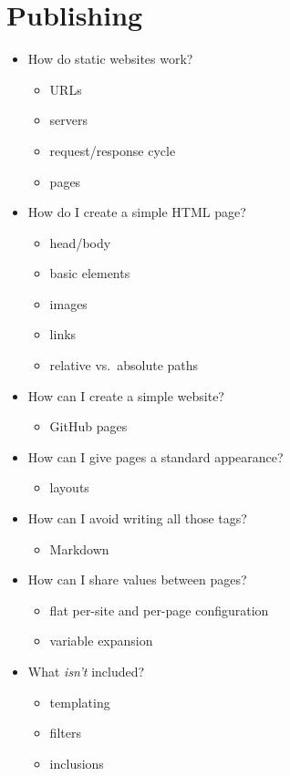 \documentclass[]{Nemilov}
\providecommand{\tightlist}{%
  \setlength{\itemsep}{0pt}\setlength{\parskip}{0pt}}
\begin{document}
\hypertarget{publishing}{%
\section{Publishing}\label{publishing}}

\begin{itemize}
\tightlist
\item
  How do static websites work?

  \begin{itemize}
  \tightlist
  \item
    URLs
  \item
    servers
  \item
    request/response cycle
  \item
    pages
  \end{itemize}
\item
  How do I create a simple HTML page?

  \begin{itemize}
  \tightlist
  \item
    head/body
  \item
    basic elements
  \item
    images
  \item
    links
  \item
    relative vs.~absolute paths
  \end{itemize}
\item
  How can I create a simple website?

  \begin{itemize}
  \tightlist
  \item
    GitHub pages
  \end{itemize}
\item
  How can I give pages a standard appearance?

  \begin{itemize}
  \tightlist
  \item
    layouts
  \end{itemize}
\item
  How can I avoid writing all those tags?

  \begin{itemize}
  \tightlist
  \item
    Markdown
  \end{itemize}
\item
  How can I share values between pages?

  \begin{itemize}
  \tightlist
  \item
    flat per-site and per-page configuration
  \item
    variable expansion
  \end{itemize}
\item
  What \emph{isn't} included?

  \begin{itemize}
  \tightlist
  \item
    templating
  \item
    filters
  \item
    inclusions
  \end{itemize}
\end{itemize}
\end{document}
